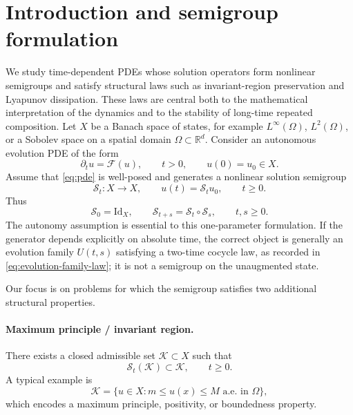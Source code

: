\documentclass[hidelinks,review,nohypdvips,onefignum,onetabnum]{siamart220329}
\newcounter{assumption}[section]
\newcounter{problem}[section]
\newcommand{\R}{\mathbb{R}}
\newcommand{\cS}{\mathcal{S}}
\newcommand{\cK}{\mathcal{K}}
\newcommand{\cF}{\mathcal{F}}
\begin{document}
\section{Introduction and semigroup formulation}\label{sec:introduction}
We study time-dependent PDEs whose solution operators form nonlinear semigroups and satisfy structural laws such as invariant-region preservation and Lyapunov dissipation. These laws are central both to the mathematical interpretation of the dynamics and to the stability of long-time repeated composition. Let \(X\) be a Banach space of states, for example \(L^{\infty}(\Omega)\), \(L^2(\Omega)\), or a Sobolev space on a spatial domain \(\Omega\subset \R^d\). Consider an autonomous evolution PDE of the form
\begin{equation}\label{eq:pde}
\partial_t u = \cF(u), \qquad t>0, \qquad u(0)=u_0\in X.
\end{equation}
Assume that \eqref{eq:pde} is well-posed \cite{CrandallLiggett1971} and generates a nonlinear solution semigroup
\begin{equation}\label{eq:semigroup-family}
\cS_t : X \to X, \qquad u(t)=\cS_tu_0, \qquad t\ge 0.
\end{equation}
Thus
\begin{equation}\label{eq:semigroup-law}
\cS_0 = \mathrm{Id}_X, \qquad \cS_{t+s}=\cS_t\circ \cS_s, \qquad t,s\ge 0.
\end{equation}
The autonomy assumption is essential to this one-parameter formulation.  If the generator depends explicitly on absolute time, the correct object is generally an evolution family \(U(t,s)\) satisfying a two-time cocycle law, as recorded in \eqref{eq:evolution-family-law}; it is not a semigroup on the unaugmented state.

Our focus is on problems for which the semigroup satisfies two additional structural properties.

\paragraph{Maximum principle / invariant region.}
There exists a closed admissible set \(\cK\subset X\) such that
\begin{equation}\label{eq:maximum-principle}
\cS_t(\cK)\subset \cK, \qquad t\ge 0.
\end{equation}
A typical example is
\begin{equation}\label{eq:box-invariant}
\cK = \{u\in X : m\le u(x)\le M \text{ a.e. in } \Omega\},
\end{equation}
which encodes a maximum principle, positivity, or boundedness property.
\end{document}
